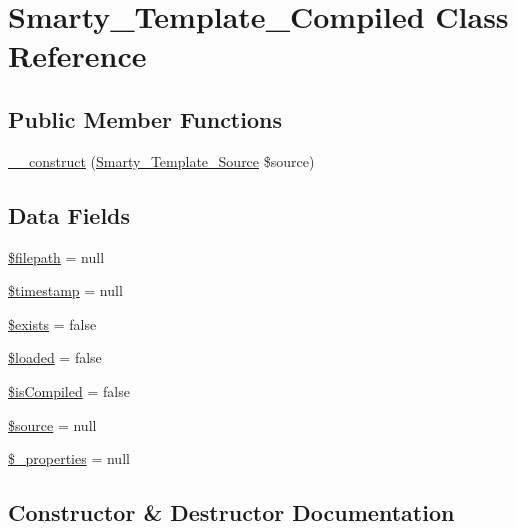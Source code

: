 \hypertarget{class_smarty___template___compiled}{}\section{Smarty\+\_\+\+Template\+\_\+\+Compiled Class Reference}
\label{class_smarty___template___compiled}
\subsection*{Public Member Functions}
\begin{DoxyCompactItemize}
\item 
\hyperlink{class_smarty___template___compiled_af79d9d321495ccac7986545d158bfeea}{\+\_\+\+\_\+construct} (\hyperlink{class_smarty___template___source}{Smarty\+\_\+\+Template\+\_\+\+Source} \$source)
\end{DoxyCompactItemize}
\subsection*{Data Fields}
\begin{DoxyCompactItemize}
\item 
\hyperlink{class_smarty___template___compiled_a3bce02156476bcca5e7573793b12226c}{\$filepath} = null
\item 
\hyperlink{class_smarty___template___compiled_a2b69de9676dd97c675cd4d9bcceb684c}{\$timestamp} = null
\item 
\hyperlink{class_smarty___template___compiled_a9af419fd2ea17d70b30ccfca4e6c1496}{\$exists} = false
\item 
\hyperlink{class_smarty___template___compiled_a3b5a1179b24abbc9be2a18eeda5ba297}{\$loaded} = false
\item 
\hyperlink{class_smarty___template___compiled_afebec6bcbbd03a1e85eb35f1aa4f9b49}{\$is\+Compiled} = false
\item 
\hyperlink{class_smarty___template___compiled_a99a2b085f0a29bd5d799fdcbb63d261b}{\$source} = null
\item 
\hyperlink{class_smarty___template___compiled_a677f712430f384ffa402fac50940ace4}{\$\+\_\+properties} = null
\end{DoxyCompactItemize}


\subsection{Constructor \& Destructor Documentation}
\hypertarget{class_smarty___template___compiled_af79d9d321495ccac7986545d158bfeea}{}
